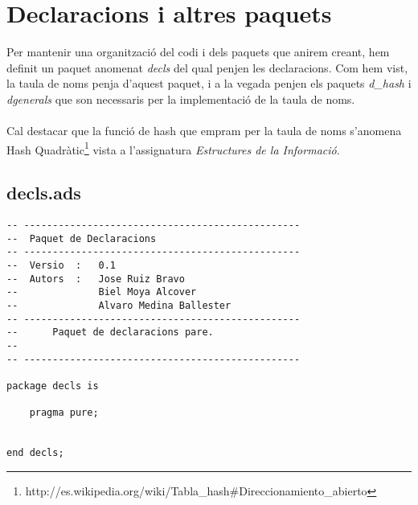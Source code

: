 \documentclass[10pt]{report}
\begin{document}
    \newpage
    \chapter{Declaracions i altres paquets}
        Per mantenir una organització del codi i dels paquets que anirem creant, hem definit un paquet anomenat \textit{decls} del qual penjen les declaracions. Com hem vist, la taula de noms penja d'aquest paquet, i a la vegada penjen els paquets \textit{d\_hash} i \textit{dgenerals} que son necessaris per la implementació de la taula de noms.
    \\
    \\
        Cal destacar que la funció de hash que empram per la taula de noms s'anomena Hash Quadràtic\footnote{http://es.wikipedia.org/wiki/Tabla\_hash\#Direccionamiento\_abierto} vista a l'assignatura \textit{Estructures de la Informació}.
    \newpage
    \section{decls.ads}
    \begin{lstlisting}[style=Ada]
-- ------------------------------------------------
--  Paquet de Declaracions
-- ------------------------------------------------
--  Versio  :   0.1
--  Autors  :   Jose Ruiz Bravo
--              Biel Moya Alcover
--              Alvaro Medina Ballester
-- ------------------------------------------------
--      Paquet de declaracions pare.
--
-- ------------------------------------------------

package decls is

    pragma pure;


end decls;
    \end{lstlisting}
    
    \newpage
\end{document}
